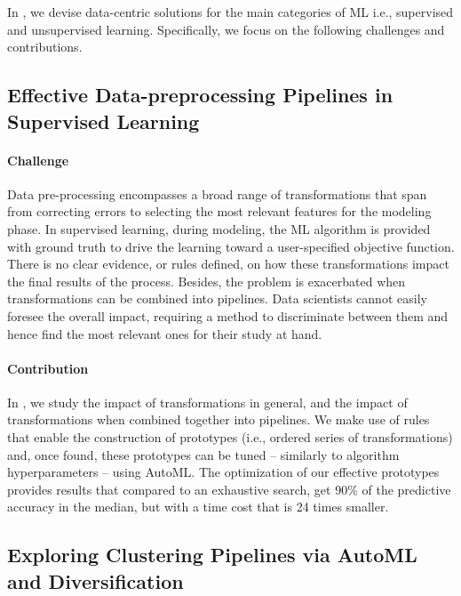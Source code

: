 In , we devise data-centric solutions for the main categories of ML i.e., supervised and unsupervised learning.
Specifically, we focus on the following challenges and contributions.

\subsection*{Effective Data-preprocessing Pipelines in Supervised Learning}

\paragraph{Challenge} Data pre-processing
encompasses a broad range of transformations that span from correcting errors to selecting the most relevant features for the modeling phase.
In supervised learning, during modeling, the ML algorithm is provided with ground truth to drive the learning toward a user-specified objective function.
There is no clear evidence, or rules defined, on how these transformations impact the final results of the process.
Besides, the problem is exacerbated when transformations can be combined into pipelines.
Data scientists cannot easily foresee the overall impact, requiring a method to discriminate between them and hence find the most relevant ones for their study at hand.

\paragraph{Contribution} In , we study the impact of transformations in general, and the impact of transformations when combined together into pipelines.
We make use of rules that enable the construction of prototypes (i.e., ordered series of transformations) and, once found, these prototypes can be tuned -- similarly to algorithm hyperparameters -- using AutoML.
The optimization of our effective prototypes provides results that compared to an exhaustive search, get 90\% of the predictive accuracy in the median, but with a time cost that is 24 times smaller.

\subsection*{Exploring Clustering Pipelines via AutoML and Diversification}



